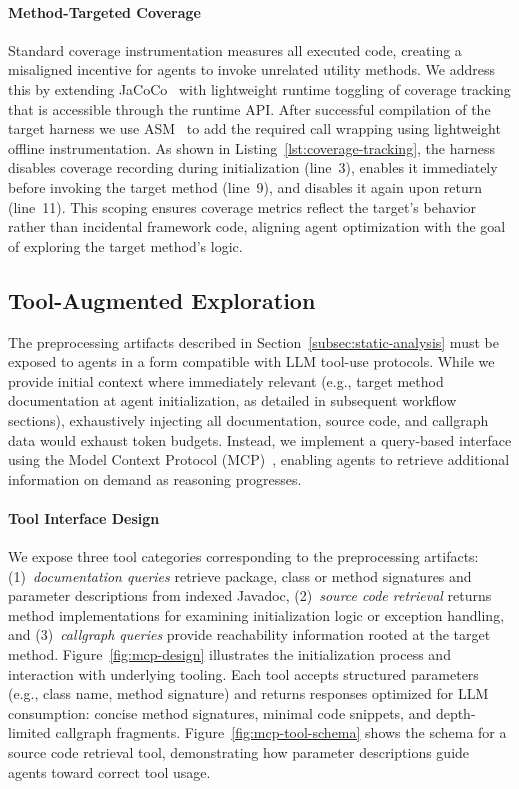 \paragraph{Method-Targeted Coverage}
Standard coverage instrumentation measures all executed code, creating a misaligned incentive for agents to invoke unrelated utility methods. We address this by extending JaCoCo~\cite{jacoco} with lightweight runtime toggling of coverage tracking that is accessible through the runtime API. After successful compilation of the target harness we use ASM~\cite{ASM} to add the required call wrapping using lightweight offline instrumentation. As shown in Listing~\ref{lst:coverage-tracking}, the harness disables coverage recording during initialization (line~3), enables it immediately before invoking the target method (line~9), and disables it again upon return (line~11). This scoping ensures coverage metrics reflect the target's behavior rather than incidental framework code, aligning agent optimization with the goal of exploring the target method's logic.
%
%
\subsection{Tool-Augmented Exploration}%
\label{subsec:tool-augmented-exploration}


The preprocessing artifacts described in Section~\ref{subsec:static-analysis} must be exposed to agents in a form compatible with LLM tool-use protocols. While we provide initial context where immediately relevant (e.g., target method documentation at agent initialization, as detailed in subsequent workflow sections), exhaustively injecting all documentation, source code, and callgraph data would exhaust token budgets. Instead, we implement a query-based interface using the Model Context Protocol (MCP)~\cite{mcp2024}, enabling agents to retrieve additional information on demand as reasoning progresses.


\paragraph{Tool Interface Design}
We expose three tool categories corresponding to the preprocessing artifacts: (1)~\emph{documentation queries} retrieve package, class or method signatures and parameter descriptions from indexed Javadoc, (2)~\emph{source code retrieval} returns method implementations for examining initialization logic or exception handling, and (3)~\emph{callgraph queries} provide reachability information rooted at the target method. Figure~\ref{fig:mcp-design} illustrates the initialization process and interaction with underlying tooling. Each tool accepts structured parameters (e.g., class name, method signature) and returns responses optimized for LLM consumption: concise method signatures, minimal code snippets, and depth-limited callgraph fragments. Figure~\ref{fig:mcp-tool-schema} shows the schema for a source code retrieval tool, demonstrating how parameter descriptions guide agents toward correct tool usage.


